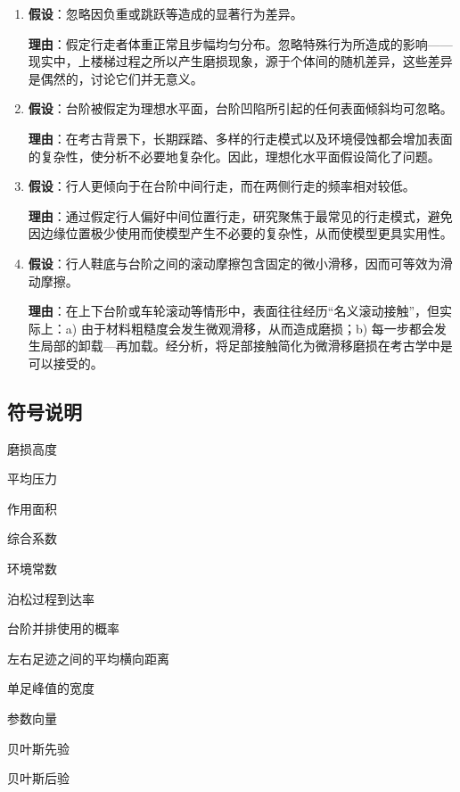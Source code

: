 \documentclass[11pt,a4paper,fontset=windows]{ctexart}
\begin{document}
\begin{enumerate}
\item \textbf{假设}：忽略因负重或跳跃等造成的显著行为差异。

\textbf{理由}：假定行走者体重正常且步幅均匀分布。忽略特殊行为所造成的影响——现实中，上楼梯过程之所以产生磨损现象，源于个体间的随机差异，这些差异是偶然的，讨论它们并无意义。

\item \textbf{假设}：台阶被假定为理想水平面，台阶凹陷所引起的任何表面倾斜均可忽略。

\textbf{理由}：在考古背景下，长期踩踏、多样的行走模式以及环境侵蚀都会增加表面的复杂性，使分析不必要地复杂化。因此，理想化水平面假设简化了问题。

\item \textbf{假设}：行人更倾向于在台阶中间行走，而在两侧行走的频率相对较低。

\textbf{理由}：通过假定行人偏好中间位置行走，研究聚焦于最常见的行走模式，避免因边缘位置极少使用而使模型产生不必要的复杂性，从而使模型更具实用性。

\item \textbf{假设}：行人鞋底与台阶之间的滚动摩擦包含固定的微小滑移，因而可等效为滑动摩擦。

\textbf{理由}：在上下台阶或车轮滚动等情形中，表面往往经历“名义滚动接触”，但实际上：a) 由于材料粗糙度会发生微观滑移，从而造成磨损；b) 每一步都会发生局部的卸载—再加载。经分析，将足部接触简化为微滑移磨损在考古学中是可以接受的。
\end{enumerate}

\subsection{符号说明}

\begin{description}[font=\normalfont,labelwidth=3.4em,leftmargin=4em,itemsep=2pt,topsep=3pt]
\item[$h$] 磨损高度
\item[$p$] 平均压力
\item[$S$] 作用面积
\item[$\kappa$] 综合系数
\item[$\beta$] 环境常数
\item[$N$] 泊松过程到达率
\item[$\alpha(N)$] 台阶并排使用的概率
\item[$\delta$] 左右足迹之间的平均横向距离
\item[$\sigma$] 单足峰值的宽度
\item[$\Theta$] 参数向量
\item[$p(\Theta)$] 贝叶斯先验
\item[$p(\Theta\mid\cdot)$] 贝叶斯后验
\end{description}
\end{document}
